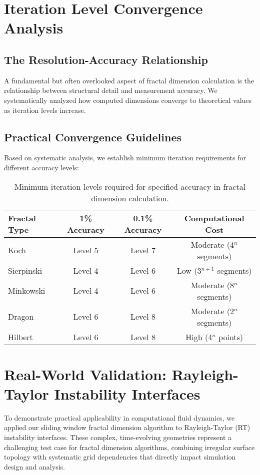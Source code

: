 \documentclass[preprint,12pt]{elsarticle}
\def\textbf#1{#1}%
\begin{document}
\section{Iteration Level Convergence Analysis}
\label{sec:iteration}

\subsection{The Resolution-Accuracy Relationship}

A fundamental but often overlooked aspect of fractal dimension calculation is the relationship between structural detail and measurement accuracy. We systematically analyzed how computed dimensions converge to theoretical values as iteration levels increase.

\subsection{Practical Convergence Guidelines}

Based on systematic analysis, we establish minimum iteration requirements for different accuracy levels:

\begin{table}[H]
\centering
\begin{tabular}{@{}lccc@{}}
\toprule
\textbf{Fractal Type} & \textbf{1\% Accuracy} & \textbf{0.1\% Accuracy} & \textbf{Computational Cost} \\
\midrule
Koch & Level 5 & Level 7 & Moderate (4$^n$ segments) \\
Sierpinski & Level 4 & Level 6 & Low (3$^{n+1}$ segments) \\
Minkowski & Level 4 & Level 6 & Moderate (8$^n$ segments) \\
Dragon & Level 6 & Level 8 & Moderate (2$^n$ segments) \\
Hilbert & Level 6 & Level 8 & High (4$^n$ points) \\
\bottomrule
\end{tabular}
\caption{Minimum iteration levels required for specified accuracy in fractal dimension calculation.}
\label{tab:convergence_requirements}
\end{table}

\section{Real-World Validation: Rayleigh-Taylor Instability Interfaces}
\label{sec:rt_validation}

To demonstrate practical applicability in computational fluid dynamics, we applied our sliding window fractal dimension algorithm to Rayleigh-Taylor (RT) instability interfaces. These complex, time-evolving geometries represent a challenging test case for fractal dimension algorithms, combining irregular surface topology with systematic grid dependencies that directly impact simulation design and analysis.
\end{document}
